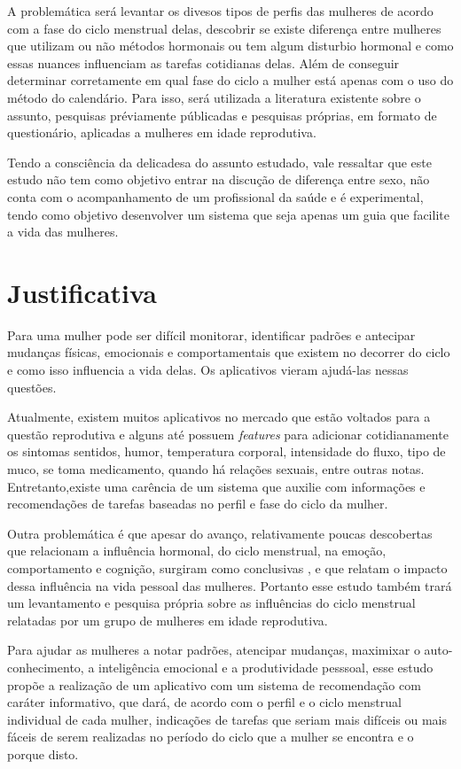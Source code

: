 A problemática será levantar os divesos tipos de perfis das mulheres de acordo com a fase do ciclo menstrual delas, descobrir se existe diferença entre mulheres que utilizam ou não métodos hormonais ou tem algum disturbio hormonal e como essas nuances influenciam as tarefas cotidianas delas. Além de conseguir determinar corretamente em qual fase do ciclo a mulher está apenas com o uso do método do calendário. Para isso, será utilizada a literatura existente sobre o assunto, pesquisas préviamente públicadas e pesquisas próprias, em formato de questionário, aplicadas a mulheres em idade reprodutiva.

Tendo a consciência da delicadesa do assunto estudado, vale ressaltar que este estudo não tem como objetivo entrar na discução de diferença entre sexo, não conta com o acompanhamento de um profissional da saúde e é experimental, tendo como objetivo desenvolver um sistema que seja apenas um guia que facilite a vida das mulheres. 

\section{Justificativa}

Para uma mulher pode ser difícil monitorar, identificar padrões e antecipar mudanças físicas, emocionais e comportamentais que existem no decorrer do ciclo e como isso influencia a vida delas. Os aplicativos vieram ajudá-las nessas questões.

Atualmente, existem muitos aplicativos no mercado que estão voltados para a questão reprodutiva e alguns até possuem \textit{features} para adicionar cotidianamente os sintomas sentidos, humor, temperatura corporal, intensidade do fluxo, tipo de muco, se toma medicamento, quando há relações sexuais, entre outras notas. Entretanto,existe uma carência de um sistema que auxilie com informações e recomendações de tarefas baseadas no perfil e fase do ciclo da mulher.

Outra problemática é que apesar do avanço, relativamente poucas descobertas que relacionam a influência hormonal, do ciclo menstrual, na emoção, comportamento e cognição, surgiram como conclusivas \cite{poroma2014}, e que relatam o impacto dessa influência na vida pessoal das mulheres. Portanto esse estudo também trará um levantamento e pesquisa própria sobre as influências do ciclo menstrual relatadas por um grupo de mulheres em idade reprodutiva.

Para ajudar as mulheres a notar padrões, atencipar mudanças, maximixar o auto-conhecimento, a inteligência emocional e a produtividade pesssoal, esse estudo propõe a realização de um aplicativo com um sistema de recomendação com caráter informativo, que dará, de acordo com o perfil e o ciclo menstrual individual de cada mulher, indicações de tarefas que seriam mais difíceis ou mais fáceis de serem realizadas no período do ciclo que a mulher se encontra e o porque disto.



